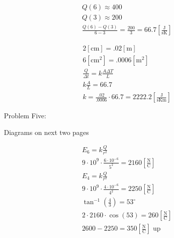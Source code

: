 \documentclass[12pt]{article}
\begin{document}
\hline

\begin{equation}
  \begin{split}
    Q(6)\approx400\\
    Q(3)\approx200\\
  \frac{Q(6)-Q(3)}{6-3}=\frac{200}{3}=66.7\left[ \frac{\si{\joule}}{\si{\second\kelvin}} \right]
\end{split}
  \label{9}
\end{equation}

\begin{equation}
  \begin{split}
    2[\si{\centi\meter}]=.02[\si{\meter}]\\
    6[\si{\centi\meter\squared}]=.0006[\si{\meter\squared}]\\
    \frac{Q}{\Delta t}=k\frac{A\Delta T}{L}\\
    k\frac{A}{L}=66.7\\
  k=\frac{.02}{.0006}\cdot66.7=2222.2\left[ \frac{\si{\joule}}{\si{\second\kelvin\meter}} \right]
\end{split}
  \label{10}
\end{equation}

\hline

\newpage

\begin{center}
  Problem Five:
\end{center}
\hline

\begin{center}
  Diagrams on next two pages
\end{center}

    \begin{equation}
      \begin{split}
        E_6=k\frac{Q}{r^2}\\
        9\cdot10^9\cdot\frac{6\cdot10^{-6}}{5^2}=2160\left[ \frac{\si{\newton}}{\si{\coulomb}} \right]\\
        E_4=k\frac{Q}{r^2}\\
        9\cdot10^9\cdot\frac{4\cdot10^{-6}}{4^2}=2250\left[ \frac{\si{\newton}}{\si{\coulomb}} \right]\\
        \tan^{-1}\left( \frac{4}{3} \right)=53^{\circ}\\
        2\cdot2160\cdot\cos(53)=260\left[ \frac{\si{\newton}}{\si{\coulomb}} \right]\\
        2600-2250=350\left[ \frac{\si{\newton}}{\si{\coulomb}} \right]\text{ up }
      \end{split}
      \label{11}
    \end{equation}
\end{document}
